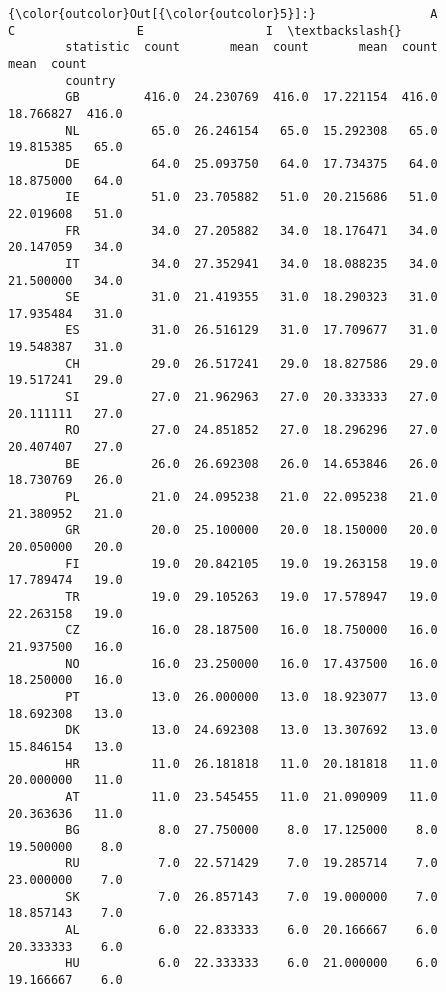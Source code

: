 \documentclass[11pt]{article}
\begin{document}
            \begin{Verbatim}[commandchars=\\\{\}]
{\color{outcolor}Out[{\color{outcolor}5}]:}                A                 C                 E                 I  \textbackslash{}
        statistic  count       mean  count       mean  count       mean  count   
        country                                                                  
        GB         416.0  24.230769  416.0  17.221154  416.0  18.766827  416.0   
        NL          65.0  26.246154   65.0  15.292308   65.0  19.815385   65.0   
        DE          64.0  25.093750   64.0  17.734375   64.0  18.875000   64.0   
        IE          51.0  23.705882   51.0  20.215686   51.0  22.019608   51.0   
        FR          34.0  27.205882   34.0  18.176471   34.0  20.147059   34.0   
        IT          34.0  27.352941   34.0  18.088235   34.0  21.500000   34.0   
        SE          31.0  21.419355   31.0  18.290323   31.0  17.935484   31.0   
        ES          31.0  26.516129   31.0  17.709677   31.0  19.548387   31.0   
        CH          29.0  26.517241   29.0  18.827586   29.0  19.517241   29.0   
        SI          27.0  21.962963   27.0  20.333333   27.0  20.111111   27.0   
        RO          27.0  24.851852   27.0  18.296296   27.0  20.407407   27.0   
        BE          26.0  26.692308   26.0  14.653846   26.0  18.730769   26.0   
        PL          21.0  24.095238   21.0  22.095238   21.0  21.380952   21.0   
        GR          20.0  25.100000   20.0  18.150000   20.0  20.050000   20.0   
        FI          19.0  20.842105   19.0  19.263158   19.0  17.789474   19.0   
        TR          19.0  29.105263   19.0  17.578947   19.0  22.263158   19.0   
        CZ          16.0  28.187500   16.0  18.750000   16.0  21.937500   16.0   
        NO          16.0  23.250000   16.0  17.437500   16.0  18.250000   16.0   
        PT          13.0  26.000000   13.0  18.923077   13.0  18.692308   13.0   
        DK          13.0  24.692308   13.0  13.307692   13.0  15.846154   13.0   
        HR          11.0  26.181818   11.0  20.181818   11.0  20.000000   11.0   
        AT          11.0  23.545455   11.0  21.090909   11.0  20.363636   11.0   
        BG           8.0  27.750000    8.0  17.125000    8.0  19.500000    8.0   
        RU           7.0  22.571429    7.0  19.285714    7.0  23.000000    7.0   
        SK           7.0  26.857143    7.0  19.000000    7.0  18.857143    7.0   
        AL           6.0  22.833333    6.0  20.166667    6.0  20.333333    6.0   
        HU           6.0  22.333333    6.0  21.000000    6.0  19.166667    6.0   

\end{Verbatim}
\end{document}
